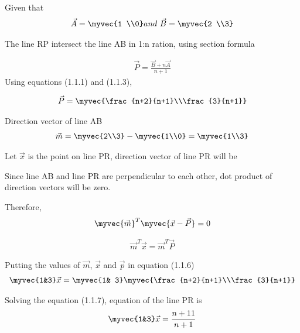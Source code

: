 
Given that
\begin{align}
\vec{A}=\myvec{1 \\0}   and \ \vec{B}= \myvec{2 \\3}
\end{align}

The line RP intersect the line AB in 1:n ration, using section formula


\begin{align}
\vec{P}=\frac{\vec{B}+n\vec{A}}{n+1}  
\end{align}
Using equations (1.1.1) and (1.1.3), 

\begin{align}
\vec{P} = \myvec{\frac{n+2}{n+1}\\\frac{3}{n+1}}
\end{align}

Direction vector of line AB
\begin{align}
 \vec{m}=\myvec{2\\3}-\myvec{1\\0} = \myvec{1\\3} 
\end{align}

Let $\vec{x}$ is the point on line PR, direction vector of line PR will be 

Since line AB and line PR are perpendicular to each other, dot product of direction vectors will be zero.

Therefore, 
\begin{align}
\myvec{\vec{m}}^T\myvec{\vec{x}-\vec{P}}=0
\end{align}




\begin{align}
\vec{m}^T\vec{x}=\vec{m}^T\vec{P}
\end{align}



Putting the values of $\vec{m}$, $\vec{x}$ and $\vec{p} $ in equation (1.1.6)
\begin{align}
\myvec{1&3}\vec{x}=\myvec{1& 3}\myvec{\frac{n+2}{n+1}\\\frac{3}{n+1}}
\end{align}

Solving the equation (1.1.7), 
equation of the line PR is
\begin{align}
\myvec{1&3}\vec{x} = \frac{n+11}{n+1}
\end{align}

